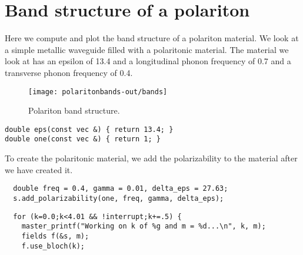 \section{Band structure of a polariton}

\begin{comment}
#include <stdio.h>
#include <stdlib.h>

#include <meep.hpp>
using namespace meep;

const double rmax = 1.0;
\end{comment}

Here we compute and plot the band structure of a polariton material.  We
look at a simple metallic waveguide filled with a polaritonic material.
The material we look at has an epsilon of 13.4 and a longitudinal phonon
frequency of 0.7 and a transverse phonon frequency of 0.4.

\begin{figure}
\label{polaritonbands}
\caption{Polariton band structure.}
\texttt{[image: polaritonbands-out/bands]}
\end{figure}

\begin{verbatim}
double eps(const vec &) { return 13.4; }
double one(const vec &) { return 1; }
\end{verbatim}

\begin{comment}
int main(int argc, char **argv) {
  initialize mpi(argc, argv);
  deal_with_ctrl_c();
  const int a = 10;
  const int m = 0;
  double k;
  const double ttot = 1000;  
\end{comment}

\begin{comment}
  structure s(volcyl(rmax, 0.0, a), eps);
  const char *dirname = make_output_directory(__FILE__);
  s.set_output_directory(dirname);
  grace g("bands", dirname);
  g.set_range(0.0, 4.0, 0.0, 1.1);
\end{comment}

To create the polaritonic material, we add the polarizability to the
material after we have created it.

\begin{verbatim}
  double freq = 0.4, gamma = 0.01, delta_eps = 27.63;
  s.add_polarizability(one, freq, gamma, delta_eps);
\end{verbatim}

\begin{verbatim}
  for (k=0.0;k<4.01 && !interrupt;k+=.5) {
    master_printf("Working on k of %g and m = %d...\n", k, m);
    fields f(&s, m);
    f.use_bloch(k);
\end{verbatim}

